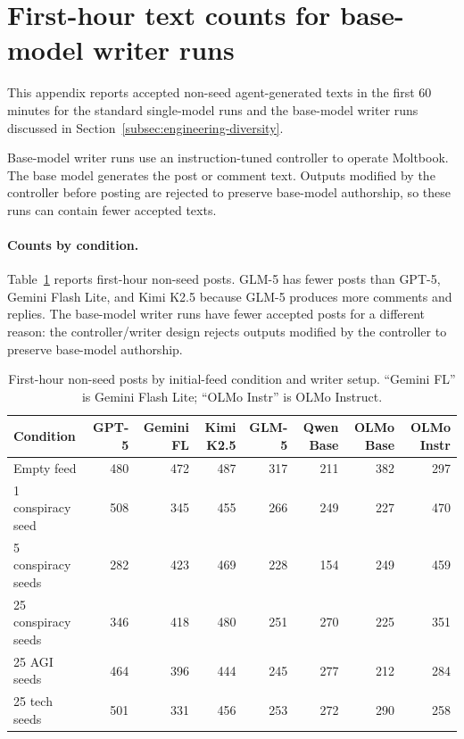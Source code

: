 \documentclass[11pt]{article}
\begin{document}
\section{First-hour text counts for base-model writer runs}
\label{app:base-counts}

This appendix reports accepted non-seed agent-generated texts in the first $60$ minutes for the standard single-model runs and the base-model writer runs discussed in Section~\ref{subsec:engineering-diversity}.

Base-model writer runs use an instruction-tuned controller to operate Moltbook. The base model generates the post or comment text. Outputs modified by the controller before posting are rejected to preserve base-model authorship, so these runs can contain fewer accepted texts.

\paragraph{Counts by condition.}
Table~\ref{tab:appendix-counts} reports first-hour non-seed posts. GLM-5 has fewer posts than GPT-5, Gemini Flash Lite, and Kimi K2.5 because GLM-5 produces more comments and replies. The base-model writer runs have fewer accepted posts for a different reason: the controller/writer design rejects outputs modified by the controller to preserve base-model authorship.

\begin{table}[t]
\centering
\small
\begin{tabular}{lrrrrrrr}
\toprule
Condition & GPT-5 & Gemini FL & Kimi K2.5 & GLM-5 & Qwen Base & OLMo Base & OLMo Instr \\
\midrule
Empty feed              & 480 & 472 & 487 & 317 & 211 & 382 & 297 \\
1 conspiracy seed       & 508 & 345 & 455 & 266 & 249 & 227 & 470 \\
5 conspiracy seeds      & 282 & 423 & 469 & 228 & 154 & 249 & 459 \\
25 conspiracy seeds     & 346 & 418 & 480 & 251 & 270 & 225 & 351 \\
25 AGI seeds            & 464 & 396 & 444 & 245 & 277 & 212 & 284 \\
25 tech seeds           & 501 & 331 & 456 & 253 & 272 & 290 & 258 \\
\bottomrule
\end{tabular}
\caption{First-hour non-seed posts by initial-feed condition and writer setup. ``Gemini FL'' is Gemini Flash Lite; ``OLMo Instr'' is OLMo Instruct.}
\label{tab:appendix-counts}
\end{table}
\end{document}
